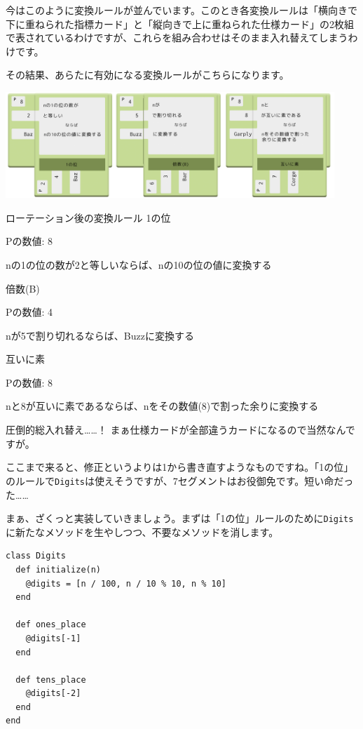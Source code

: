 \documentclass[index]{subfiles}
\begin{document}
今はこのように変換ルールが並んでいます。このとき各変換ルールは「横向きで下に重ねられた指標カード」と「縦向きで上に重ねられた仕様カード」の2枚組で表されているわけですが、これらを組み合わせはそのまま入れ替えてしまうわけです。

その結果、あらたに有効になる変換ルールがこちらになります。

\begin{center}
  \includegraphics[height=4cm]{image/216_replay_2_6.png}
\end{center}

\begin{itembox}[l]{ローテーション後の変換ルール}
{\sf 1の位}

\hspace{1em}Pの数値: 8

\hspace{1em}nの1の位の数が2と等しいならば、nの10の位の値に変換する

{\sf 倍数(B)}

\hspace{1em}Pの数値: 4

\hspace{1em}nが5で割り切れるならば、Buzzに変換する

{\sf 互いに素}

\hspace{1em}Pの数値: 8

\hspace{1em}nと8が互いに素であるならば、nをその数値(8)で割った余りに変換する
\end{itembox}

圧倒的総入れ替え……！ まぁ仕様カードが全部違うカードになるので当然なんですが。

ここまで来ると、修正というよりは1から書き直すようなものですね。「1の位」のルールで\verb+Digits+は使えそうですが、7セグメントはお役御免です。短い命だった……

まぁ、ざくっと実装していきましょう。まずは「1の位」ルールのために\verb+Digits+に新たなメソッドを生やしつつ、不要なメソッドを消します。

\begin{lstlisting}
class Digits
  def initialize(n)
    @digits = [n / 100, n / 10 % 10, n % 10]
  end

  def ones_place
    @digits[-1]
  end

  def tens_place
    @digits[-2]
  end
end
\end{lstlisting}
\end{document}
